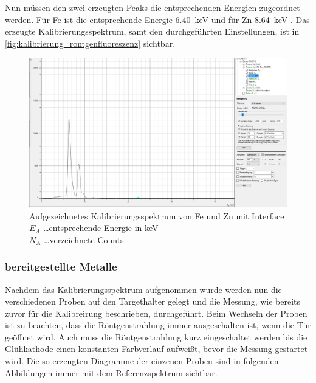 \documentclass[12pt,english,ngerman]{scrartcl}
\begin{document}
Nun müssen den zwei erzeugten Peaks die entsprechenden Energien zugeordnet
werden. Für Fe ist die entsprechende Energie \SI{6.40}{keV} und für Zn
\SI{8.64}{keV} \cite{koller_experimente_nodate}. Das erzeugte
Kalibrierungsspektrum, samt den durchgeführten Einstellungen, ist in
\autoref{fig:kalibrierung_rontgenfluoreszenz} sichtbar.

\begin{figure}[H]
	\begin{center}
		\includegraphics[width =\textwidth]{./figures/roentgen/FeZnKalibrierung.PNG}
	\end{center}
	\caption[Aufgezeichnetes Kalibrierungsspektrum mit Interface] {\footnotesize
		Aufgezeichnetes Kalibrierungsspektrum von Fe und Zn mit Interface \\
		$E_A$ \dots entsprechende Energie in keV                          \\
		$N_A$ \dots verzeichnete Counts
	}\label{fig:kalibrierung_rontgenfluoreszenz}
\end{figure}

\subsubsection{bereitgestellte Metalle}

Nachdem das Kalibrierungsspektrum aufgenommen wurde werden nun die
verschiedenen Proben auf den Targethalter gelegt und die Messung, wie bereits
zuvor für die Kalibreirung beschrieben, durchgeführt. Beim Wechseln der Proben
ist zu beachten, dass die Röntgenstrahlung immer ausgeschalten ist, wenn die
Tür geöffnet wird. Auch muss die Röntgenstrahlung kurz eingeschaltet werden bis
die Glühkathode einen konstanten Farbverlauf aufweißt, bevor die Messung
gestartet wird. Die so erzeugten Diagramme der einzenen Proben sind in
folgenden Abbildungen immer mit dem Referenzspektrum sichtbar.
\end{document}
